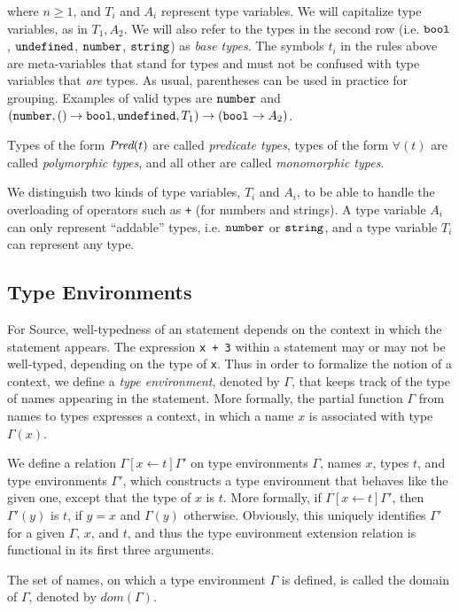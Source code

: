 \noindent
where $n \geq 1$, and $T_i$ and $A_i$ represent type variables. We will capitalize 
type variables, as in $T_1, A_2$. We will also refer to the types in the second row (i.e. $\texttt{bool}$,
$\texttt{undefined}$, $\texttt{number}$, $\texttt{string}$) as \emph{base types}. The symbols $t_i$ in the rules above
are meta-variables that stand for types and must not be confused with type variables
that \emph{are} types.
As usual, parentheses can be used in practice for grouping.
Examples of valid types are $\texttt{number}$ and
$(\texttt{number}, () \rightarrow \texttt{bool}, \texttt{undefined}, T_1) \rightarrow (\texttt{bool} \rightarrow A_2)$.

Types of the form $\textit{Pred} ( t )$ are called \emph{predicate types},
types of the form $\forall ( t )$ are called \emph{polymorphic types},
and all other are called \emph{monomorphic types}.

We distinguish two kinds of type variables, $T_i$ and $A_i$, to be able to handle
the overloading of operators such as \texttt{+} (for numbers and strings).
A type variable $A_i$ can only
represent ``addable'' types, i.e. 
$\texttt{number}$ or $\texttt{string}$, and
a type variable $T_i$ can represent any type.

\subsection{Type Environments}

For Source, well-typedness of an statement depends on the context in which the
statement appears. The expression \verb#x + 3# within a statement may or may 
not be well-typed, depending on the type of \verb#x#. Thus in order 
to formalize the notion of a context, we define a 
\emph{type environment}, denoted by $\Gamma$, that keeps track
of the type of names appearing in the statement. More
formally,
the partial function $\Gamma$ from names to types expresses a 
context, in which a name $x$ is associated with type $\Gamma(x)$. 

We define a relation $\Gamma[x \leftarrow t]\Gamma'$ on type environments 
$\Gamma$, names $x$, types $t$, and type environments $\Gamma'$,
which constructs a type environment that behaves like the 
given one, except that the type of $x$ is $t$. More formally, 
if $\Gamma[x \leftarrow t]\Gamma'$, then $\Gamma'(y)$ is $t$, 
if $y=x$ and $\Gamma(y)$ 
otherwise. Obviously, this uniquely identifies $\Gamma'$ for
a given $\Gamma$, $x$, and $t$, and thus the type environment extension
relation is functional in its first three arguments.

The set of names, on which a type environment
$\Gamma$ is defined, is called the domain of $\Gamma$, 
denoted by $\textit{dom}(\Gamma)$.


